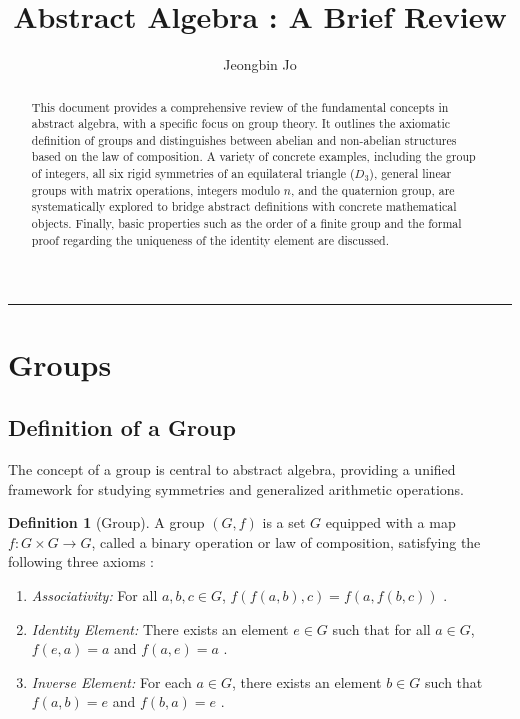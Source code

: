 \documentclass[11pt]{article}
\title{Abstract Algebra : A Brief Review}
\author{Jeongbin Jo}
\affil{Department of Physics, Yonsei University, \texttt{jeongbin033@yonsei.ac.kr}}
\theoremstyle{definition}
\newtheorem{definition}{Definition}[section]
\theoremstyle{plain}
\theoremstyle{remark}
\begin{document}
\maketitle

\begin{abstract}
This document provides a comprehensive review of the fundamental concepts in abstract algebra, with a specific focus on group theory. It outlines the axiomatic definition of groups and distinguishes between abelian and non-abelian structures based on the law of composition. A variety of concrete examples, including the group of integers, all six rigid symmetries of an equilateral triangle ($D_3$), general linear groups with matrix operations, integers modulo $n$, and the quaternion group, are systematically explored to bridge abstract definitions with concrete mathematical objects. Finally, basic properties such as the order of a finite group and the formal proof regarding the uniqueness of the identity element are discussed.
\end{abstract}

\tableofcontents
\vspace{0.3cm}
\hrule
\vspace{0.5cm}

\section{Groups}

\subsection{Definition of a Group}

The concept of a group is central to abstract algebra, providing a unified framework for studying symmetries and generalized arithmetic operations.

\begin{definition}[Group]
A group $(G, f)$ is a set $G$ equipped with a map $f: G \times G \to G$, called a binary operation or law of composition, satisfying the following three axioms \cite{dummit, fraleigh}:
\begin{enumerate}
    \item \emph{Associativity:} For all $a, b, c \in G$, $f(f(a,b),c) = f(a,f(b,c))$ \cite{dummit}.
    \item \emph{Identity Element:} There exists an element $e \in G$ such that for all $a \in G$, $f(e,a) = a$ and $f(a,e) = a$ \cite{fraleigh}.
    \item \emph{Inverse Element:} For each $a \in G$, there exists an element $b \in G$ such that $f(a, b) = e$ and $f(b, a) = e$ \cite{dummit}.
\end{enumerate}
\end{definition}
\end{document}
